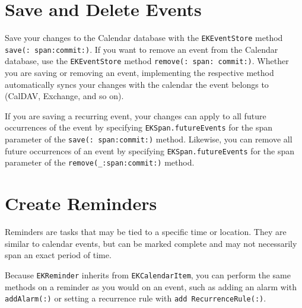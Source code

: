 \documentclass{article}
\begin{document}
\section*{Save and Delete Events}

\noindent{}

Save your changes to the Calendar database with the \texttt{EKEventStore} method \texttt{save(: span:commit:)}. If you want to remove an event from the Calendar database, use the \texttt{EKEventStore} method \texttt{remove(: span: commit:)}. Whether you are saving or removing an event, implementing the respective method automatically syncs your changes with the calendar the event belongs to (CalDAV, Exchange, and so on).

If you are saving a recurring event, your changes can apply to all future occurrences of the event by specifying \texttt{EKSpan.futureEvents} for the span parameter of the \texttt{save(: span:commit:)} method. Likewise, you can remove all future occurrences of an event by specifying \texttt{EKSpan.futureEvents} for the span parameter of the \texttt{remove(\_:span:commit:)} method.

\noindent{}

\section*{Create Reminders}
Reminders are tasks that may be tied to a specific time or location. They are similar to calendar events, but can be marked complete and may not necessarily span an exact period of time.

Because \texttt{EKReminder} inherits from \texttt{EKCalendarItem}, you can perform the same methods on a reminder as you would on an event, such as adding an alarm with \texttt{addAlarm(:)} or setting a recurrence rule with \texttt{add RecurrenceRule(:)}.
\end{document}
